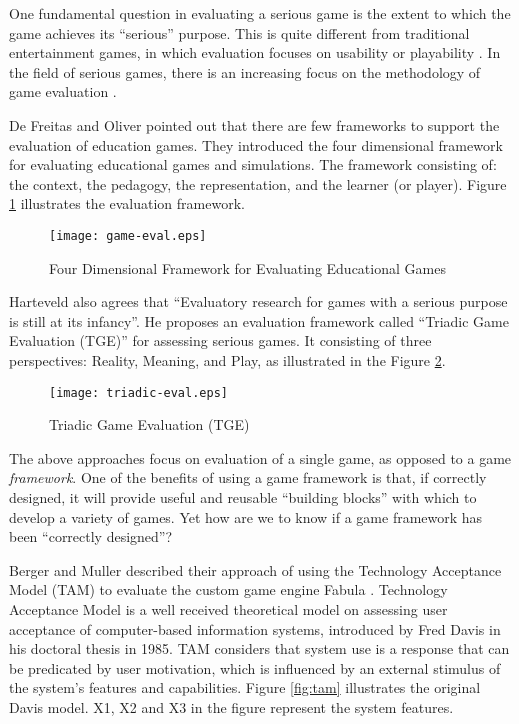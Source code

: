 One fundamental question in evaluating a serious game is the extent to which the
game achieves its ``serious'' purpose.  This is quite different from 
traditional entertainment games, in which evaluation focuses on usability or
playability \cite{song2007new}. In the field of serious games, there is an increasing
focus on the methodology of game evaluation \cite{Mayer2012233}. 

De Freitas and Oliver \cite{de2006can} pointed out that there are few frameworks to support the evaluation of education games. They introduced the four dimensional framework for evaluating 
educational games and simulations. The framework consisting of: the context, the pedagogy, the representation, and the learner (or player). Figure \ref{fig:four-dimensional-framework} illustrates the evaluation framework.

\begin{figure}[htbp]
	\centering
		\texttt{[image: game-eval.eps]}
		\caption{Four Dimensional Framework for Evaluating Educational Games \cite{de2006can}}
		\label{fig:four-dimensional-framework}
\end{figure}

Harteveld \cite{harteveld2010triadic} also agrees that ``Evaluatory research for games with a serious purpose is still at its infancy''. He proposes an evaluation framework called ``Triadic Game Evaluation (TGE)'' for assessing serious games. It consisting of three perspectives: Reality,
Meaning, and Play, as illustrated in the Figure \ref{fig:triadic-game-eval}.

\begin{figure}[htbp]
	\centering
		\texttt{[image: triadic-eval.eps]}
		\caption{Triadic Game Evaluation (TGE) \cite{harteveld2010triadic}}
		\label{fig:triadic-game-eval}
\end{figure}

The above approaches focus on evaluation of a single game, as opposed to a game {\em
  framework}. One of the benefits of using a game framework is that, if correctly designed, it will provide useful and reusable ``building blocks'' with which to develop a variety of games. Yet how are we to know if a game framework has been ``correctly designed''?

Berger and Muller \cite {fabulaengine} described their approach of using the Technology Acceptance Model (TAM) to evaluate the custom game engine Fabula \cite{fabula}. Technology Acceptance Model \cite {davis1986technology} is a well received theoretical model on assessing user acceptance of computer-based information systems, introduced by Fred Davis in his doctoral thesis in 1985. TAM considers that system use is a response that can be predicated by user motivation, which is influenced by an external stimulus of the system's features and capabilities. Figure \ref{fig:tam} illustrates the original Davis model. X1, X2 and X3 in the figure represent the system features.

